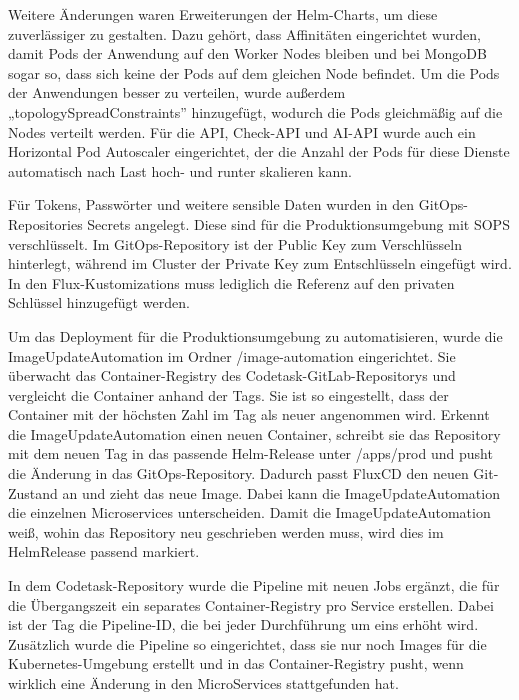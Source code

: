 Weitere Änderungen waren Erweiterungen der Helm-Charts, um diese zuverlässiger zu gestalten. 
Dazu gehört, dass Affinitäten eingerichtet wurden, damit Pods der Anwendung auf den Worker Nodes bleiben und bei MongoDB sogar so, dass sich keine der Pods auf dem gleichen Node befindet.
Um die Pods der Anwendungen besser zu verteilen, wurde außerdem „topologySpreadConstraints” hinzugefügt, wodurch die Pods gleichmäßig auf die Nodes verteilt werden.
Für die API, Check-API und AI-API wurde auch ein Horizontal Pod Autoscaler eingerichtet, der die Anzahl der Pods für diese Dienste automatisch nach Last hoch- und runter skalieren kann.

Für Tokens, Passwörter und weitere sensible Daten wurden in den GitOps-Repositories Secrets angelegt. Diese sind für die Produktionsumgebung mit SOPS verschlüsselt.
Im GitOps-Repository ist der Public Key zum Verschlüsseln hinterlegt, während im Cluster der Private Key zum Entschlüsseln eingefügt wird. In den Flux-Kustomizations muss lediglich die Referenz auf den privaten Schlüssel hinzugefügt werden.

Um das Deployment für die Produktionsumgebung zu automatisieren, wurde die ImageUpdateAutomation im Ordner /image-automation eingerichtet.
Sie überwacht das Container-Registry des Codetask-GitLab-Repositorys und vergleicht die Container anhand der Tags.
Sie ist so eingestellt, dass der Container mit der höchsten Zahl im Tag als neuer angenommen wird.
Erkennt die ImageUpdateAutomation einen neuen Container, schreibt sie das Repository mit dem neuen Tag in das passende Helm-Release unter /apps/prod und pusht die Änderung in das GitOps-Repository. Dadurch passt FluxCD den neuen Git-Zustand an und zieht das neue Image.
Dabei kann die ImageUpdateAutomation die einzelnen Microservices unterscheiden. Damit die ImageUpdateAutomation weiß, wohin das Repository neu geschrieben werden muss, wird dies im HelmRelease passend markiert.

In dem Codetask-Repository wurde die Pipeline mit neuen Jobs ergänzt, die für die Übergangszeit ein separates Container-Registry pro Service erstellen. Dabei ist der Tag die Pipeline-ID, die bei jeder Durchführung um eins erhöht wird.
Zusätzlich wurde die Pipeline so eingerichtet, dass sie nur noch Images für die Kubernetes-Umgebung erstellt und in das Container-Registry pusht, wenn wirklich eine Änderung in den MicroServices stattgefunden hat.
